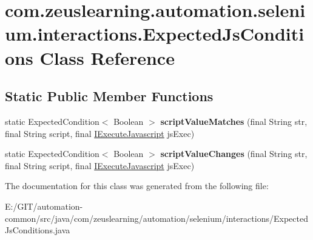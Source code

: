 \hypertarget{classcom_1_1zeuslearning_1_1automation_1_1selenium_1_1interactions_1_1ExpectedJsConditions}{}\section{com.\+zeuslearning.\+automation.\+selenium.\+interactions.\+Expected\+Js\+Conditions Class Reference}
\label{classcom_1_1zeuslearning_1_1automation_1_1selenium_1_1interactions_1_1ExpectedJsConditions}
\subsection*{Static Public Member Functions}
\begin{DoxyCompactItemize}
\item 
\hypertarget{classcom_1_1zeuslearning_1_1automation_1_1selenium_1_1interactions_1_1ExpectedJsConditions_ae763957f764cc3351027eae9ed7be5c8}{}\label{classcom_1_1zeuslearning_1_1automation_1_1selenium_1_1interactions_1_1ExpectedJsConditions_ae763957f764cc3351027eae9ed7be5c8} 
static Expected\+Condition$<$ Boolean $>$ {\bfseries script\+Value\+Matches} (final String str, final String script, final \hyperlink{interfacecom_1_1zeuslearning_1_1automation_1_1interactions_1_1IExecuteJavascript}{I\+Execute\+Javascript} js\+Exec)
\item 
\hypertarget{classcom_1_1zeuslearning_1_1automation_1_1selenium_1_1interactions_1_1ExpectedJsConditions_a9eb93c334c2e480f6f3ea185df5985b3}{}\label{classcom_1_1zeuslearning_1_1automation_1_1selenium_1_1interactions_1_1ExpectedJsConditions_a9eb93c334c2e480f6f3ea185df5985b3} 
static Expected\+Condition$<$ Boolean $>$ {\bfseries script\+Value\+Changes} (final String str, final String script, final \hyperlink{interfacecom_1_1zeuslearning_1_1automation_1_1interactions_1_1IExecuteJavascript}{I\+Execute\+Javascript} js\+Exec)
\end{DoxyCompactItemize}


The documentation for this class was generated from the following file\+:\begin{DoxyCompactItemize}
\item 
E\+:/\+G\+I\+T/automation-\/common/src/java/com/zeuslearning/automation/selenium/interactions/Expected\+Js\+Conditions.\+java\end{DoxyCompactItemize}

